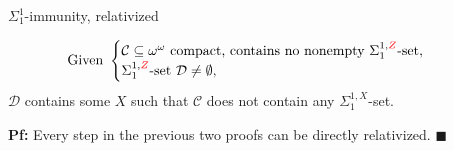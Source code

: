 \begin{frame}{$\Sigma_1^{1}$-immunity, relativized}
  \begin{coro*}
    \begin{align*}
      \text{Given } &\begin{cases}
        \mathcal{C}\subseteq\omega^\omega \text{ compact, contains
        no nonempty } \Sigma^{1,\textcolor{red}{Z}}_{1}\text{-set},\\
        \Sigma^{1,\textcolor{red}{Z}}_{1}\text{-set }
        \mathcal{D}\neq\emptyset,
      \end{cases}
    \end{align*}
    $\mathcal{D}$ contains some $X$ such that $\mathcal{C}$ does not
    contain any $\Sigma_1^{1,X}$-set.
  \end{coro*}

  \pause
  \vspace{2em}
  \textbf{Pf:} Every step in the previous two proofs can be directly
  relativized.
  $\blacksquare$
\end{frame}
